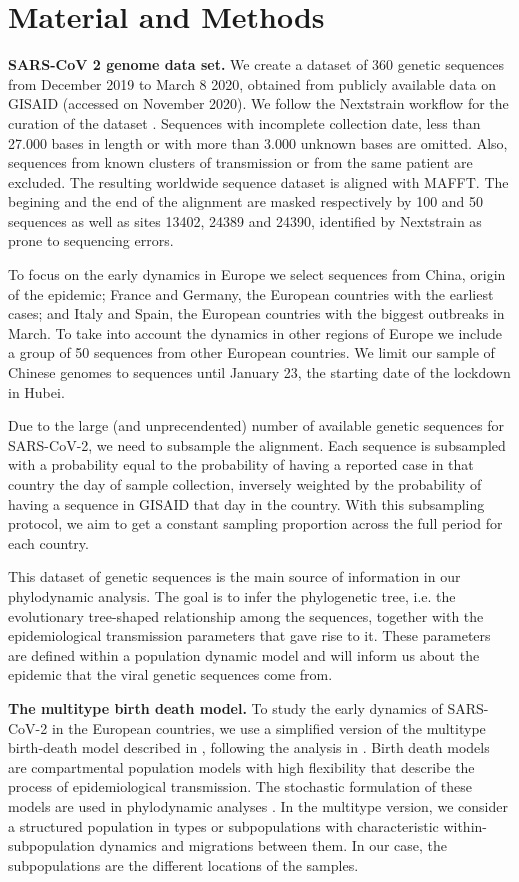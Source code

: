 \chapter{Material and Methods}

\textbf{SARS-CoV 2 genome data set.} 
We create a dataset of 360 genetic sequences from December 2019 to March 8 2020, obtained from publicly available data on GISAID \cite{Shu2017} (accessed on November 2020). We follow the Nextstrain workflow for the curation of the dataset \cite{nextstrain}. Sequences with incomplete collection date, less than 27.000 bases in length or with more than 3.000 unknown bases are omitted. Also, sequences from known clusters of transmission or from the same patient are excluded. The resulting worldwide sequence dataset is aligned with MAFFT. The begining and the end of the alignment are masked respectively by 100 and 50 sequences as well as sites  13402, 24389 and 24390, identified by Nextstrain as prone to sequencing errors.

To focus on the early dynamics in Europe we select sequences from China, origin of the epidemic; France and Germany, the European countries with the earliest cases; and Italy and Spain, the European countries with the biggest outbreaks in March. To take into account the dynamics in other regions of Europe we include a group of 50 sequences from other European countries. We limit our sample of Chinese genomes to sequences until January 23, the starting date of the lockdown in Hubei. 

Due to the large (and unprecendented) number of available genetic sequences for SARS-CoV-2, we need to subsample the alignment. Each sequence is subsampled with a probability equal to the probability of having a reported case in that country the day of sample collection, inversely weighted by the probability of having a sequence in GISAID that day in the country. With this subsampling protocol, we aim to get a constant sampling proportion across the full period for each country. 

This dataset of genetic sequences is the main source of information in our phylodynamic analysis. The goal is to infer the phylogenetic tree, i.e. the evolutionary tree-shaped relationship among the sequences, together with the epidemiological transmission parameters that gave rise to it. These parameters are defined within a population dynamic model and will inform us about the epidemic that the viral genetic sequences come from.

\textbf{The multitype birth death model.} 
To study the early dynamics of SARS-CoV-2 in the European countries, we use a simplified version of the multitype birth-death model described in \cite{Kuhnert2016}, following the analysis in \cite{Nadeau2020}. Birth death models are compartmental population models with high flexibility that describe the process of epidemiological transmission. The stochastic formulation of these models are used in phylodynamic analyses \cite{Stadler2012}. In the multitype version, we consider a structured population in types or subpopulations with characteristic within-subpopulation dynamics and migrations between them. In our case, the subpopulations are the different locations of the samples.

